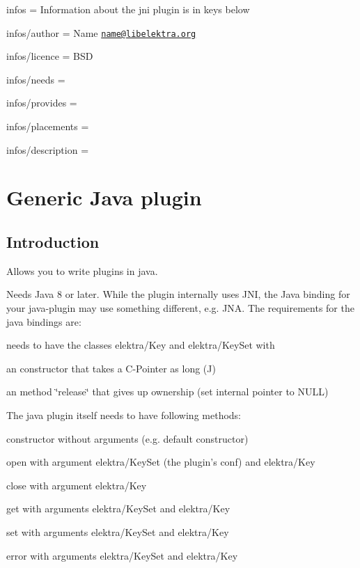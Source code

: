 
\begin{DoxyItemize}
\item infos = Information about the jni plugin is in keys below
\item infos/author = Name \href{mailto:name@libelektra.org}{\tt name@libelektra.\+org}
\item infos/licence = B\+S\+D
\item infos/needs =
\item infos/provides =
\item infos/placements =
\item infos/description =
\end{DoxyItemize}\hypertarget{md_src_plugins_jni_README_src_plugins_jni_README_md}{}\section{Generic Java plugin}\label{md_src_plugins_jni_README_src_plugins_jni_README_md}
\subsection*{Introduction}

Allows you to write plugins in java.

Needs Java 8 or later. While the plugin internally uses J\+N\+I, the Java binding for your java-\/plugin may use something different, e.\+g. J\+N\+A. The requirements for the java bindings are\+:


\begin{DoxyItemize}
\item needs to have the classes elektra/\+Key and elektra/\+Key\+Set with
\begin{DoxyItemize}
\item an constructor that takes a C-\/\+Pointer as long (J)
\item an method \char`\"{}release\char`\"{} that gives up ownership (set internal pointer to N\+U\+L\+L)
\end{DoxyItemize}
\end{DoxyItemize}

The java plugin itself needs to have following methods\+:


\begin{DoxyItemize}
\item constructor without arguments (e.\+g. default constructor)
\item open with argument elektra/\+Key\+Set (the plugin's conf) and elektra/\+Key
\item close with argument elektra/\+Key
\item get with arguments elektra/\+Key\+Set and elektra/\+Key
\item set with arguments elektra/\+Key\+Set and elektra/\+Key
\item error with arguments elektra/\+Key\+Set and elektra/\+Key
\end{DoxyItemize}

